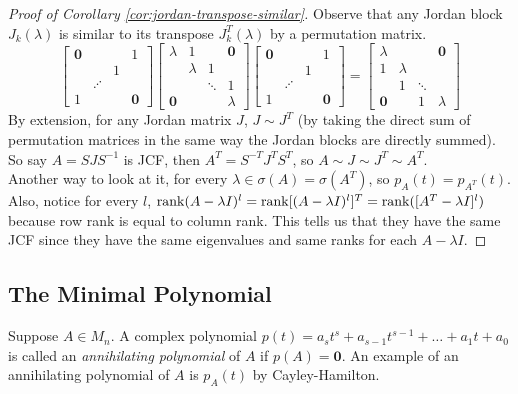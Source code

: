 \begin{proof}[Proof of Corollary \ref{cor:jordan-transpose-similar}]
Observe that any Jordan block $J_k(\lambda)$ is similar to its transpose $J_k^T(\lambda)$ by a permutation matrix.
$$
\begin{bmatrix}
\mathbf{0} & & & 1 \\
  & & 1 & \\
  & \iddots & & \\
1 & & & \mathbf{0}
\end{bmatrix}
\begin{bmatrix}
\lambda & 1 & & \mathbf{0} \\
 & \lambda & 1 &  \\
 & & \ddots & 1 \\
 \mathbf{0} & &  &\lambda
\end{bmatrix}
\begin{bmatrix}
\mathbf{0} & & & 1 \\
  & & 1 & \\
  & \iddots & & \\
1 & & & \mathbf{0}
\end{bmatrix}
= 
\begin{bmatrix}
\lambda & & & \mathbf{0} \\
1 & \lambda & & \\
 & 1 & \ddots & \\
\mathbf{0} & & 1 & \lambda
\end{bmatrix}
$$
By extension, for any Jordan matrix $J$, $J \sim J^T$ (by taking the direct sum of permutation matrices in the same way the Jordan blocks are directly summed). So say $A = SJS^{-1}$ is JCF, then $A^T = S^{-T}J^TS^T$, so $A \sim J \sim J^T \sim A^T$. \\

\noindent Another way to look at it, for every $\lambda \in \sigma(A) = \sigma(A^T)$, so $p_A(t) = p_{A^T}(t)$. Also, notice for every $l$, $\operatorname{rank}(A-\lambda I)^l = \operatorname{rank}[(A - \lambda I)^l]^T = \operatorname{rank}([A^T - \lambda I]^l)$ because row rank is equal to column rank. This tells us that they have the same JCF since they have the same eigenvalues and same ranks for each $A - \lambda I$.
\end{proof}

\subsection{The Minimal Polynomial}
\begin{definition}
\label{def:annihilating-polynomial}
Suppose $A \in M_n$. A complex polynomial $p(t) = a_st^s + a_{s-1}t^{s-1} + \dots + a_1t + a_0$ is called an \textit{annihilating polynomial} of $A$ if $p(A) = \mathbf{0}$. An example of an annihilating polynomial of $A$ is $p_A(t)$ by Cayley-Hamilton.
\end{definition}

